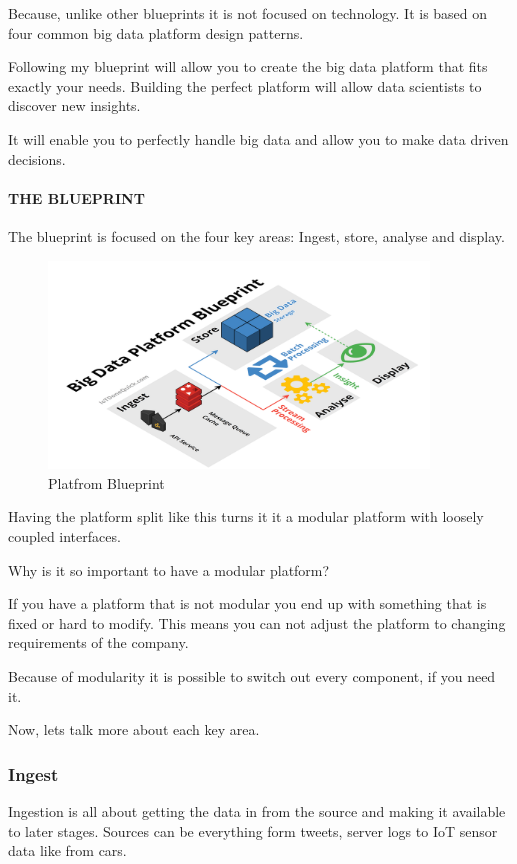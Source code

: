 \documentclass[12pt]{scrartcl} %
\begin{document}
Because, unlike other blueprints it is not focused on technology. It is based on four common big data platform design patterns.

Following my blueprint will allow you to create the big data platform that fits exactly your needs. Building the perfect platform will allow data scientists to discover new insights.

It will enable you to perfectly handle big data and allow you to make data driven decisions.

\paragraph{THE BLUEPRINT}
The blueprint is focused on the four key areas: Ingest, store, analyse and display.

\begin{figure}[htbp]
  \centering
     \includegraphics[width=0.9\textwidth]{images/Big-Data-Platform-Blueprint-Title-Original.png}
  \caption{Platfrom Blueprint}
  \label{fig:Bild1}
\end{figure}


Having the platform split like this turns it it a modular platform with loosely coupled interfaces.

Why is it so important to have a modular platform?

If you have a platform that is not modular you end up with something that is fixed or hard to modify. This means you can not adjust the platform to changing requirements of the company.

Because of modularity it is possible to switch out every component, if you need it.

Now, lets talk more about each key area.

\subsubsection{Ingest}
Ingestion is all about getting the data in from the source and making it available to later stages. Sources can be everything form tweets, server logs to IoT sensor data like from cars.
\end{document}
